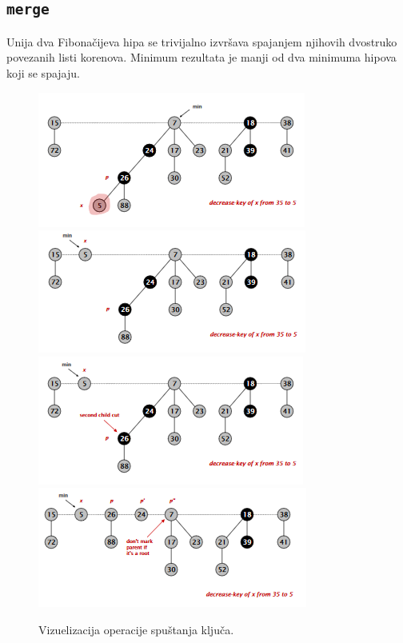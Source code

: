 \documentclass[a4paper]{article}
\theoremstyle{plain}
\theoremstyle{definition}
\begin{document}
\subsection{\texttt{merge}}
\label{subsec:merge}

Unija dva Fibona\v{c}ijeva hipa se trivijalno izvr\v{s}ava spajanjem njihovih dvostruko povezanih listi korenova. Minimum rezultata je manji od dva minimuma hipova koji se spajaju.

\begin{figure}[H]
    \centering
    \includegraphics[scale=0.8]{resources/fig5a.PNG}
    \includegraphics[scale=0.8]{resources/fig5b.PNG}\\
    \includegraphics[scale=0.8]{resources/fig5c.PNG}
    \includegraphics[scale=0.8]{resources/fig5d.PNG}
    \caption{Vizuelizacija operacije spu\v{s}tanja klju\v{c}a.}
    \label{fig5}
\end{figure}
\end{document}
